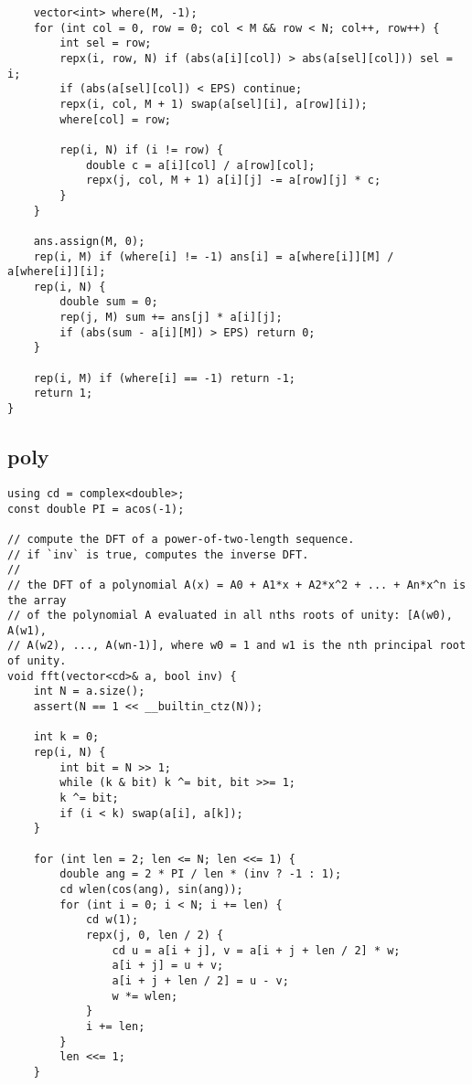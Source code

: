 \documentclass[twoside]{article}
\begin{document}
\begin{multicols*}{2}
\begin{verbatim}
    vector<int> where(M, -1);
    for (int col = 0, row = 0; col < M && row < N; col++, row++) {
        int sel = row;
        repx(i, row, N) if (abs(a[i][col]) > abs(a[sel][col])) sel = i;
        if (abs(a[sel][col]) < EPS) continue;
        repx(i, col, M + 1) swap(a[sel][i], a[row][i]);
        where[col] = row;

        rep(i, N) if (i != row) {
            double c = a[i][col] / a[row][col];
            repx(j, col, M + 1) a[i][j] -= a[row][j] * c;
        }
    }

    ans.assign(M, 0);
    rep(i, M) if (where[i] != -1) ans[i] = a[where[i]][M] / a[where[i]][i];
    rep(i, N) {
        double sum = 0;
        rep(j, M) sum += ans[j] * a[i][j];
        if (abs(sum - a[i][M]) > EPS) return 0;
    }

    rep(i, M) if (where[i] == -1) return -1;
    return 1;
}
\end{verbatim}

{
\subsection*{poly}
}
\begin{verbatim}
using cd = complex<double>;
const double PI = acos(-1);

// compute the DFT of a power-of-two-length sequence.
// if `inv` is true, computes the inverse DFT.
//
// the DFT of a polynomial A(x) = A0 + A1*x + A2*x^2 + ... + An*x^n is the array
// of the polynomial A evaluated in all nths roots of unity: [A(w0), A(w1),
// A(w2), ..., A(wn-1)], where w0 = 1 and w1 is the nth principal root of unity.
void fft(vector<cd>& a, bool inv) {
    int N = a.size();
    assert(N == 1 << __builtin_ctz(N));

    int k = 0;
    rep(i, N) {
        int bit = N >> 1;
        while (k & bit) k ^= bit, bit >>= 1;
        k ^= bit;
        if (i < k) swap(a[i], a[k]);
    }

    for (int len = 2; len <= N; len <<= 1) {
        double ang = 2 * PI / len * (inv ? -1 : 1);
        cd wlen(cos(ang), sin(ang));
        for (int i = 0; i < N; i += len) {
            cd w(1);
            repx(j, 0, len / 2) {
                cd u = a[i + j], v = a[i + j + len / 2] * w;
                a[i + j] = u + v;
                a[i + j + len / 2] = u - v;
                w *= wlen;
            }
            i += len;
        }
        len <<= 1;
    }


\end{verbatim}
\end{multicols*}
\end{document}
